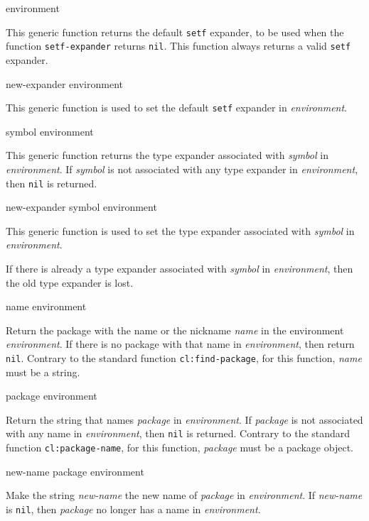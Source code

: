  {environment}

This generic function returns the default \texttt{setf} expander, to
be used when the function \texttt{setf-expander} returns \texttt{nil}.
This function always returns a valid \texttt{setf} expander.

 {new-expander environment}

This generic function is used to set the default \texttt{setf}
expander in \textit{environment}.

 {symbol environment}

This generic function returns the type expander associated with
\textit{symbol} in \textit{environment}.  If \textit{symbol} is not
associated with any type expander in \textit{environment}, then
\texttt{nil} is returned.

 {new-expander symbol environment}

This generic function is used to set the type expander associated with
\textit{symbol} in \textit{environment}.

If there is already a type expander associated with \textit{symbol} in
\textit{environment}, then the old type expander is lost.

 {name environment}

Return the package with the name or the nickname \textit{name} in the
environment \textit{environment}.  If there is no package with that
name in \textit{environment}, then return \texttt{nil}.  Contrary to
the standard \commonlisp{} function \texttt{cl:find-package}, for this
function, \textit{name} must be a string.

 {package environment}

Return the string that names \textit{package} in \textit{environment}.
If \textit{package} is not associated with any name in
\textit{environment}, then \texttt{nil} is returned.  Contrary to the
standard \commonlisp{} function \texttt{cl:package-name}, for this
function, \textit{package} must be a package object.

 {new-name package environment}

Make the string \textit{new-name} the new name of \textit{package} in
\textit{environment}.  If \textit{new-name} is \texttt{nil}, then
\textit{package} no longer has a name in \textit{environment}.

